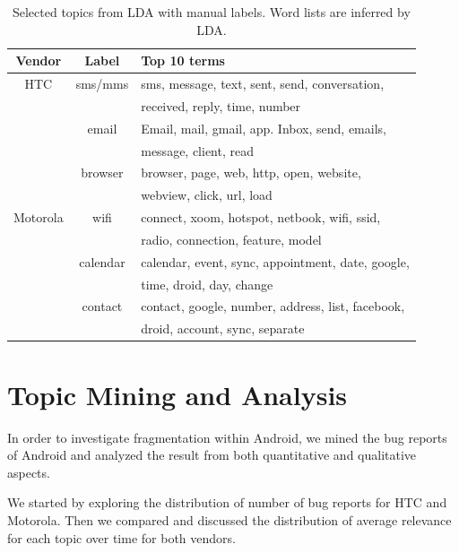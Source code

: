 \documentclass[10pt, conference, compsocconf]{IEEEtran}
\begin{document}
\begin{table}[!t]
\renewcommand{\arraystretch}{1.3}
\caption{Selected topics from LDA with manual labels. Word lists are inferred by LDA.}
\label{seleted2}
\centering
\begin{tabular}{|c||c||l|}
\hline
Vendor & Label & Top 10 terms\\
\hline
HTC & sms\//mms &sms, message, text, sent, send, conversation, \\
            && received, reply, time, number \\ \cline{2-3}
  & email & Email, mail, gmail, app. Inbox, send, emails, \\
            &&message, client, read \\ \cline{2-3}
  & browser&browser, page, web, http, open, website, \\
            &&webview, click, url, load\\
\hline
Motorola & wifi &connect, xoom, hotspot, netbook, wifi, ssid, \\
           &&radio, connection, feature, model\\ \cline{2-3}
    &calendar& calendar, event, sync, appointment, date, google, \\
           &&time, droid, day, change \\ \cline{2-3}
    &contact & contact, google, number, address, list, facebook, \\
           &&droid, account, sync, separate \\
\hline
\end{tabular}
\end{table}


\section{Topic Mining and Analysis}

In order to investigate fragmentation within Android, we mined the bug reports of Android and analyzed the result from both quantitative and qualitative aspects.

We started by exploring the distribution of number of bug reports for HTC and Motorola. Then we compared and discussed the distribution of average relevance for each topic over time for both vendors.
\end{document}
